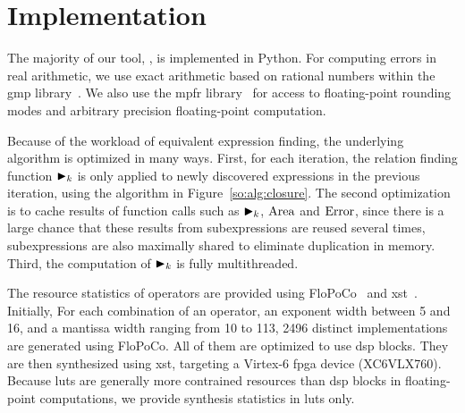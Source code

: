 \section{Implementation}
\label{so:sec:implementation}

The majority of our tool, \soap, is implemented in Python. For computing
errors in real arithmetic, we use exact arithmetic based on rational
numbers within the \gls{gmp} library~\cite{gmp}. We also use the \gls{mpfr}
library~\cite{mpfr} for access to floating-point rounding modes and arbitrary
precision floating-point computation.

Because of the workload of equivalent expression finding, the underlying
algorithm is optimized in many ways. First, for each iteration, the relation
finding function $\operatorname{\blacktriangleright}_k$ is only applied to newly discovered expressions in
the previous iteration, using the algorithm in Figure~\ref{so:alg:closure}. The
second optimization is to cache results of function calls such as $\operatorname{\blacktriangleright}_k$,
$\operatorname{\mathrm{Area}}$ and $\operatorname{\mathrm{Error}}$, since there is a large chance that these results
from subexpressions are reused several times, subexpressions are also
maximally shared to eliminate duplication in memory. Third, the computation of
$\operatorname{\blacktriangleright}_k$ is fully multithreaded.

The resource statistics of operators are provided using FloPoCo~\cite{flopoco}
and \gls{xst}~\cite{xst}. Initially, For each combination of an operator, an
exponent width between 5 and 16, and a mantissa width ranging from 10 to 113,
2496 distinct implementations are generated using FloPoCo. All of them are
optimized to use \gls{dsp} blocks. They are then synthesized using \gls{xst},
targeting a Virtex-6 \gls{fpga} device (XC6VLX760). Because \glspl{lut} are
generally more contrained resources than \gls{dsp} blocks in floating-point
computations, we provide synthesis statistics in \glspl{lut} only.
